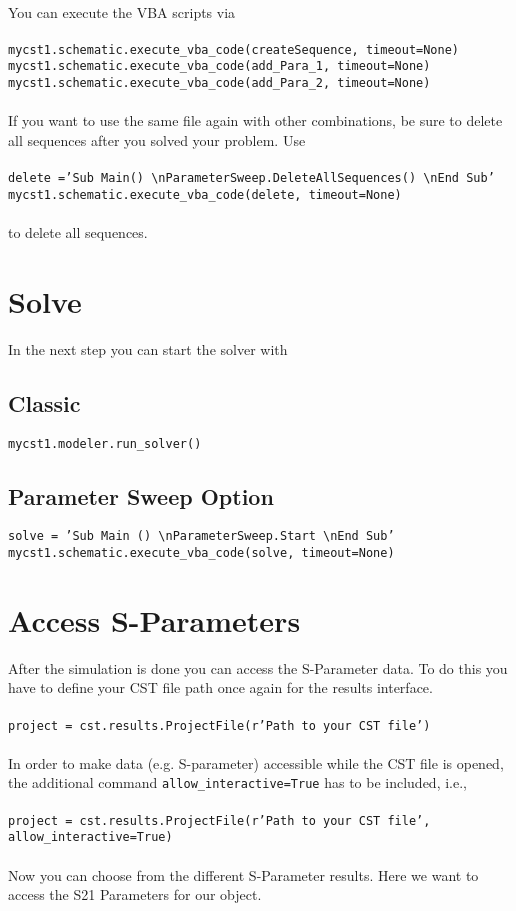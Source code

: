 \documentclass[12pt,accentcolor=tud2b, colorback, openany]{tudreport}
\begin{document}
	\\
	You can execute the VBA scripts via\\
	\\
	\texttt{mycst1.schematic.execute\_vba\_code(createSequence, timeout=None)\\
		mycst1.schematic.execute\_vba\_code(add\_Para\_1, timeout=None)\\
		mycst1.schematic.execute\_vba\_code(add\_Para\_2, timeout=None)}\\
	\\
	If you want to use the same file again with other combinations, be sure to delete all sequences after you solved your problem. Use\\
	\\
	\texttt{delete ='Sub Main() \textbackslash nParameterSweep.DeleteAllSequences() \textbackslash nEnd Sub'\\
	mycst1.schematic.execute\_vba\_code(delete, timeout=None)}\\
	\\
	to delete all sequences.
	\section{Solve}
	In the next step you can start the solver with
	\subsection{Classic}
	\texttt{mycst1.modeler.run\_solver()}
	\subsection{Parameter Sweep Option}
	\texttt{solve = 'Sub Main () \textbackslash nParameterSweep.Start \textbackslash nEnd Sub'\\
	mycst1.schematic.execute\_vba\_code(solve, timeout=None)}
	\section{Access S-Parameters}
	After the simulation is done you can access the S-Parameter data. To do this you have to define your CST file path once again for the results interface.\\
	\\
	\texttt{project = cst.results.ProjectFile(r'Path to your CST file')}\\
	\\
	In order to make data (e.g. S-parameter) accessible while the CST file is opened, the additional command \texttt{allow\_interactive=True} has to be included, i.e.,\\
	\\
	\texttt{project = cst.results.ProjectFile(r'Path to your CST file', allow\_interactive=True)}\\
	\\
	Now you can choose from the different S-Parameter results. Here we want to access the S21 Parameters for our object.
	
\end{document}
